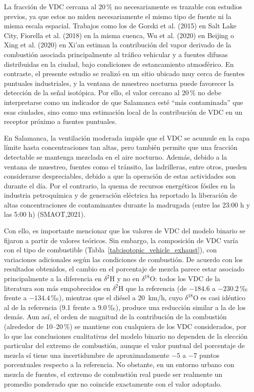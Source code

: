 La fracción de VDC cercana al 20\,\% no necesariamente es trazable con estudios previos,
ya que estos no miden necesariamente el mismo tipo de fuente 
ni la misma escala espacial. Trabajos como los de Gorski et al. (2015) en Salt Lake 
City, Fiorella et al. (2018) en la misma cuenca, Wu et al. (2020) en Beijing o 
Xing et al. (2020) en Xi’an estiman la contribución del vapor derivado de la 
combustión asociada principalmente al tráfico vehicular y a fuentes difusas 
distribuidas en la ciudad, bajo condiciones de estancamiento atmosférico. En 
contraste, el presente estudio se realizó en un sitio ubicado muy cerca de fuentes 
puntuales industriales, y la ventana de muestreo nocturna puede favorecer 
la detección de la señal isotópica. Por ello, el valor cercano al 20\,\% no debe 
interpretarse como un indicador de que Salamanca esté “más contaminada” que esas 
ciudades, sino como una estimación local de la contribución de VDC en un receptor 
próximo a fuentes puntuales.

En Salamanca, la ventilación moderada 
impide que el VDC se acumule en la capa límite hasta concentraciones tan altas, 
pero también permite que una fracción detectable se mantenga mezclada en el aire nocturno. Además, 
debido a la ventana de muestreo, fuentes como el tránsito, las ladrilleras, entre otros,
pueden considerarse despreciables, debido a que la operación de estas actividades son 
durante el día. Por el contrario, la quema de recursos energéticos fósiles en la industria 
petroquímica y de generación eléctrica ha reportado la liberación de altas 
concentraciones de contaminantes durante la madrugada (entre las 23:00 h y las 5:00 h) (SMAOT,2021).

Con ello, es importante mencionar que los valores de VDC del modelo binario se fijaron a partir 
de valores teóricos. Sin embargo, la composición de VDC varía con el tipo de combustible 
(Tabla~\ref{tab:isotopic_vehicle_exhaust}), con variaciones adicionales según las condiciones
de combustión. De acuerdo con los resultados obtenidos, 
el cambio en el porcentaje de mezcla parece estar asociado principalmente
a la diferencia en $\delta^{2}\mathrm{H}$ y no en $\delta^{18}\mathrm{O}$: todos los
VDC de la literatura son más empobrecidos en $\delta^{2}\mathrm{H}$ que la referencia
(de $-184.6$ a $-230.2$\,‰ frente a $-134.4$\,‰), mientras que el diésel a 20~km/h,
cuyo $\delta^{18}\mathrm{O}$ es casi idéntico al de la referencia (9.1 frente a 9.0\,‰),
produce una reducción similar a la de los demás. 
Aun así, el orden de magnitud de la contribución de
la combustión (alrededor de 10--20\,\%) se mantiene con cualquiera de los VDC
considerados, por lo que las conclusiones cualitativas del modelo binario no dependen
de la elección particular del extremo de combustión, aunque el valor puntual del
porcentaje de mezcla sí tiene una incertidumbre de aproximadamente $-5$ a $-7$ puntos
porcentuales respecto a la referencia. No obstante, 
en un entorno urbano con mezcla de fuentes, el extremo de combustión real 
puede ser realmente un promedio ponderado que no coincide exactamente con el valor 
adoptado. 

